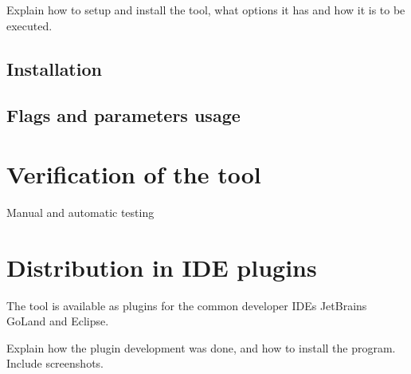 Explain how to setup and install the tool, what options it has and how it is to be executed.


\subsection{Installation}\label{subsec:go-geiger-installation}


\subsection{Flags and parameters usage}\label{subsec:go-geiger-flags}



\section{Verification of the tool}\label{sec:go-geiger-verification}

Manual and automatic testing



\section{Distribution in IDE plugins}\label{sec:go-geiger-ide-plugin}

The tool is available as plugins for the common developer IDEs JetBrains GoLand and Eclipse.

Explain how the plugin development was done, and how to install the program. Include
screenshots.
